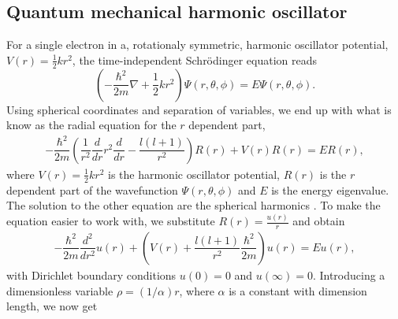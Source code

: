 \documentclass{emulateapj}
\begin{document}
    \subsection{\textbf{Quantum mechanical harmonic oscillator}}
        For a single electron in a, rotationaly symmetric, harmonic oscillator potential, \(V(r) = \frac{1}{2}kr^{2}\), the time-independent Schr\"odinger equation reads
        \begin{equation*}
            \left(-\frac{\hbar^{2}}{2m}\nabla+\frac{1}{2}kr^{2}\right)\Psi(r,\theta,\phi) =  E\Psi(r,\theta,\phi).
        \end{equation*}
        Using spherical coordinates and separation of variables, we end up with what is know as the radial equation for the \(r\) dependent part,
        \begin{align*}
            -\dfrac{\hbar^2}{2m}\left(\dfrac{1}{r^2}\dfrac{d}{dr}r^2\dfrac{d}{dr} - \dfrac{l(l + 1)}{r^2}\right)R(r) + V(r)R(r)
            = ER(r),
        \end{align*}
        where \(V(r)=\tfrac{1}{2}kr^2\) is the harmonic oscillator potential, \(R(r)\) is the \(r\) dependent part of the wavefunction \(\Psi(r,\theta,\phi)\) and \(E\) is the energy eigenvalue. The solution to the other equation are the spherical harmonics \cite[chapter 4]{griffiths}.
        To make the equation easier to work with, we substitute \(R(r) = \frac{u(r)}{r}\) and obtain
        \begin{align*}
            -\dfrac{\hbar^2}{2m}\dfrac{d^2}{dr^2}u(r) + \left(V(r) + \dfrac{l(l + 1)}{r^2}\dfrac{\hbar^2}{2m}\right)u(r)
            = Eu(r),
        \end{align*}
        with Dirichlet boundary conditions \(u(0) = 0\) and \(u(\infty) = 0\). Introducing a dimensionless variable \(\rho = (1/\alpha)r\), where \(\alpha\) is a constant with dimension length, we now get
\end{document}
